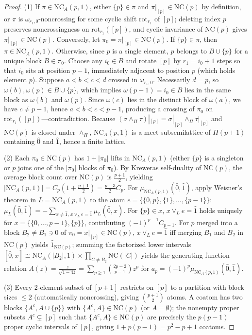 \documentclass[11pt]{article}
\theoremstyle{definition}
\newcommand{\NC}{\mathrm{NC}}
\newcommand{\NCA}{\mathrm{NC}_A}
\begin{document}
\begin{proof}
(1) If $\pi \in \NCA(p,1)$, either $\{p\} \in \pi$ and $\pi|_{[p]} \in \NC(p)$ by definition, or $\pi$ is $\omega_{r_1,0}$-noncrossing for some cyclic shift $\mathrm{rot}_{r_1}$ of $[p]$; deleting index $p$ preserves noncrossingness on $\mathrm{rot}_{r_1}([p])$, and cyclic invariance of $\NC(p)$ gives $\pi|_{[p]} \in \NC(p)$. Conversely, let $\pi_0 = \pi|_{[p]} \in \NC(p)$. If $\{p\} \in \pi$, then $\pi \in \NCA(p,1)$. Otherwise, since $p$ is a single element, $p$ belongs to $B \cup \{p\}$ for a unique block $B \in \pi_0$. Choose any $i_0 \in B$ and rotate $[p]$ by $r_1 = i_0 + 1$ steps so that $i_0$ sits at position $p-1$, immediately adjacent to position $p$ (which holds element $p$). Suppose $a < b < c < d$ crossed in $\omega_{r_1,0}$. Necessarily $d = p$, so $\omega(b), \omega(p) \in B \cup \{p\}$, which implies $\omega(p-1) = i_0 \in B$ lies in the same block as $\omega(b)$ and $\omega(p)$. Since $\omega(c)$ lies in the distinct block of $\omega(a)$, we have $c \ne p-1$, hence $a < b < c < p-1$, producing a crossing of $\pi_0$ on $\mathrm{rot}_{r_1}([p])$---contradiction. Because $(\sigma \wedge_\Pi \tau)|_{[p]} = \sigma|_{[p]} \wedge_\Pi \tau|_{[p]}$ and $\NC(p)$ is closed under $\wedge_\Pi$, $\NCA(p,1)$ is a meet-subsemilattice of $\Pi(p+1)$ containing $\hat{0}$ and $\hat{1}$, hence a finite lattice.

(2) Each $\pi_0 \in \NC(p)$ has $1 + |\pi_0|$ lifts in $\NCA(p,1)$ (either $\{p\}$ is a singleton or $p$ joins one of the $|\pi_0|$ blocks of $\pi_0$). By Kreweras self-duality of $\NC(p)$, the average block count over $\NC(p)$ is $\frac{p+1}{2}$, yielding $|\NCA(p,1)| = C_p(1 + \frac{p+1}{2}) = \frac{p+3}{2}C_p$. For $\mu_{\NCA(p,1)}(\hat{0},\hat{1})$, apply Weisner's theorem in $L = \NCA(p,1)$ to the atom $e = \{\{0,p\},\{1\},\dots,\{p-1\}\}$: $\mu_L(\hat{0},\hat{1}) = -\sum_{x \ne \hat{1},\, x \vee_L e = \hat{1}} \mu_L(\hat{0},x)$. For $\{p\} \in x$, $x \vee_L e = \hat{1}$ holds uniquely for $x = \{\{0,\dots,p-1\},\{p\}\}$, contributing $(-1)^{p-1}C_{p-1}$. For $p$ merged into a block $B_2 \ne B_1 \ni 0$ of $\pi_0 = x|_{[p]} \in \NC(p)$, $x \vee_L e = \hat{1}$ iff merging $B_1$ and $B_2$ in $\NC(p)$ yields $\hat{1}_{\NC(p)}$; summing the factorized lower intervals $[\hat{0},x] \cong \NCA(|B_2|,1) \times \prod_{C \ne B_2} \NC(|C|)$ yields the generating-function relation $A(z) = \frac{z}{\sqrt{1-4z}} = \sum_{p \ge 1} \binom{2p-2}{p-1} z^p$ for $a_p = (-1)^p \mu_{\NCA(p,1)}(\hat{0},\hat{1})$.

(3) Every $2$-element subset of $[p+1]$ restricts on $[p]$ to a partition with block sizes $\le 2$ (automatically noncrossing), giving $\binom{p+1}{2}$ atoms. A coatom has two blocks $\{A^c, A \cup \{p\}\}$ with $\{A^c, A\} \in \NC(p)$ (or $A = \emptyset$); the nonempty proper subsets $A^c \subsetneq [p]$ such that $\{A^c, A\} \in \NC(p)$ are precisely the $p(p-1)$ proper cyclic intervals of $[p]$, giving $1 + p(p-1) = p^2 - p + 1$ coatoms.
\end{proof}
\end{document}
